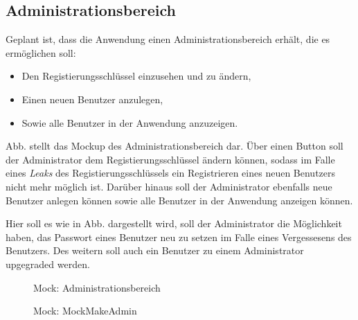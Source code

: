 \subsection{Administrationsbereich}
\label{ssec:Administrationsbereich}

Geplant ist, dass die Anwendung einen Administrationsbereich erhält, die es ermöglichen soll: 
\begin{itemize}
    \item Den Registierungsschlüssel einzusehen und zu ändern,
    \item Einen neuen Benutzer anzulegen,
    \item Sowie alle Benutzer in der Anwendung anzuzeigen. 
\end{itemize}

Abb.  stellt das Mockup des Administrationsbereich dar. 
Über einen Button soll der Administrator dem Registierungsschlüssel ändern können, sodass im Falle eines \emph{Leaks} des Registierungsschlüssels ein Registrieren eines neuen Benutzers nicht mehr möglich ist. 
Darüber hinaus soll der Administrator ebenfalls neue Benutzer anlegen können sowie alle Benutzer in der Anwendung anzeigen können. 

Hier soll es wie in Abb.  dargestellt wird, soll der Administrator die Möglichkeit haben, das Passwort eines Benutzer neu zu setzen im Falle eines Vergessesens des Benutzers.
Des weitern soll auch ein Benutzer zu einem Administrator upgegraded werden. 

\begin{figure}
	\caption[Mock: Administrationsbereich]{Mock: Administrationsbereich \\ \quelle}
	\label{fig:MockAdministrationsbereich}
\end{figure}

\begin{figure}
	\caption[Mock: MockMakeAdmin]{Mock: MockMakeAdmin \\ \quelle}
	\label{fig:MockMakeAdmin}
\end{figure}